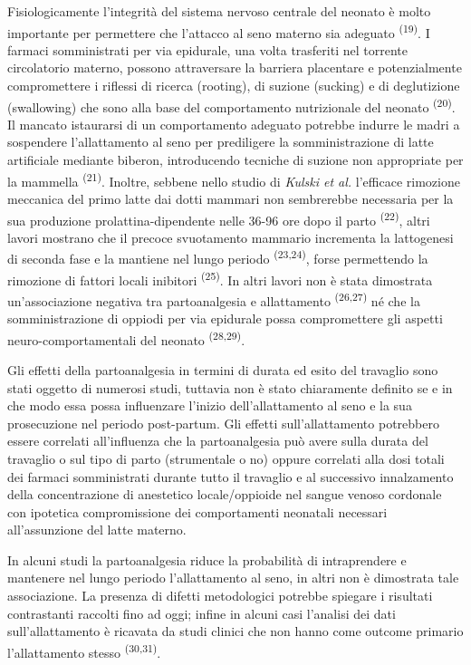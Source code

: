 \documentclass[]{article}
\begin{document}
Fisiologicamente l'integrità del sistema nervoso centrale del neonato è
molto importante per permettere che l'attacco al seno materno sia
adeguato \textsuperscript{(19)}. I farmaci somministrati per via
epidurale, una volta trasferiti nel torrente circolatorio materno,
possono attraversare la barriera placentare e potenzialmente
compromettere i riflessi di ricerca (rooting), di suzione (sucking) e di
deglutizione (swallowing) che sono alla base del comportamento
nutrizionale del neonato \textsuperscript{(20)}. Il mancato istaurarsi
di un comportamento adeguato potrebbe indurre le madri a sospendere
l'allattamento al seno per prediligere la somministrazione di latte
artificiale mediante biberon, introducendo tecniche di suzione non
appropriate per la mammella \textsuperscript{(21)}. Inoltre, sebbene
nello studio di \emph{Kulski et al.} l'efficace rimozione meccanica del
primo latte dai dotti mammari non sembrerebbe necessaria per la sua
produzione prolattina-dipendente nelle 36-96 ore dopo il parto
\textsuperscript{(22)}, altri lavori mostrano che il precoce svuotamento
mammario incrementa la lattogenesi di seconda fase e la mantiene nel
lungo periodo \textsuperscript{(23,24)}, forse permettendo la rimozione
di fattori locali inibitori \textsuperscript{(25)}. In altri lavori non
è stata dimostrata un'associazione negativa tra partoanalgesia e
allattamento \textsuperscript{(26,27)} né che la somministrazione di
oppiodi per via epidurale possa compromettere gli aspetti
neuro-comportamentali del neonato \textsuperscript{(28,29)}.

Gli effetti della partoanalgesia in termini di durata ed esito del
travaglio sono stati oggetto di numerosi studi, tuttavia non è stato
chiaramente definito se e in che modo essa possa influenzare l'inizio
dell'allattamento al seno e la sua prosecuzione nel periodo post-partum.
Gli effetti sull'allattamento potrebbero essere correlati all'influenza
che la partoanalgesia può avere sulla durata del travaglio o sul tipo di
parto (strumentale o no) oppure correlati alla dosi totali dei farmaci
somministrati durante tutto il travaglio e al successivo innalzamento
della concentrazione di anestetico locale/oppioide nel sangue venoso
cordonale con ipotetica compromissione dei comportamenti neonatali
necessari all'assunzione del latte materno.

In alcuni studi la partoanalgesia riduce la probabilità di intraprendere
e mantenere nel lungo periodo l'allattamento al seno, in altri non è
dimostrata tale associazione. La presenza di difetti metodologici
potrebbe spiegare i risultati contrastanti raccolti fino ad oggi; infine
in alcuni casi l'analisi dei dati sull'allattamento è ricavata da studi
clinici che non hanno come outcome primario l'allattamento stesso
\textsuperscript{(30,31)}.
\end{document}
